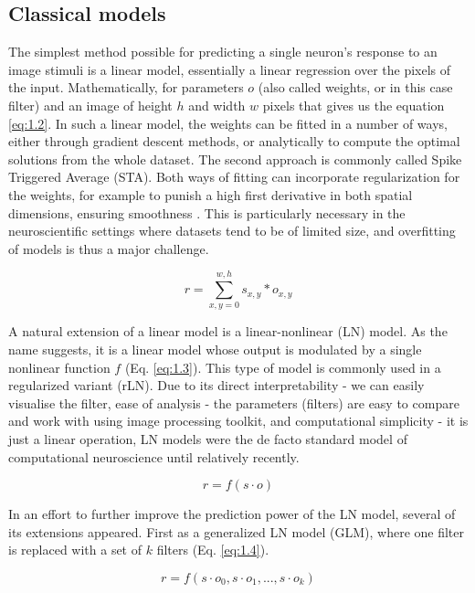 \subsection{Classical models}\label{ch:1.2.2}
The simplest method possible for predicting a single neuron’s response to an image stimuli is a linear model, essentially a linear regression over the pixels of the input. Mathematically, for parameters $o$ (also called weights, or in this case filter) and an image of height $h$ and width $w$ pixels that gives us the equation \ref{eq:1.2}. In such a linear model, the weights can be fitted in a number of ways, either through gradient descent methods, or analytically to compute the optimal solutions from the whole dataset. The second approach is commonly called Spike Triggered Average (STA). Both ways of fitting can incorporate regularization for the weights, for example to punish a high first derivative in both spatial dimensions, ensuring smoothness \citep{first_kernel}. This is particularly necessary in the neuroscientific settings where datasets tend to be of limited size, and overfitting of models is thus a major challenge. 

\begin{equation}\label{eq:1.2}
    r = \sum_{x,y=0}^{w,h} s_{x,y} * o_{x,y}
\end{equation}

A natural extension of a linear model is a linear-nonlinear (LN) model. As the name suggests, it is a linear model whose output is modulated by a single nonlinear function $f$ (Eq. \ref{eq:1.3}). This type of model is commonly used in a regularized variant (rLN). Due to its direct interpretability - we can easily visualise the filter, ease of analysis - the parameters (filters) are easy to compare and work with using image processing toolkit, and computational simplicity - it is just a linear operation, LN models were the de facto standard model of computational neuroscience until relatively recently.

\begin{equation}\label{eq:1.3}
    r = f(s \cdot o)
\end{equation}

In an effort to further improve the prediction power of the LN model, several of its extensions appeared. First as a generalized LN model (GLM), where one filter is replaced with a set of $k$ filters (Eq. \ref{eq:1.4}). 

\begin{equation}\label{eq:1.4}
    r = f(s \cdot o_0, s \cdot o_1, ..., s \cdot o_k)
\end{equation}

